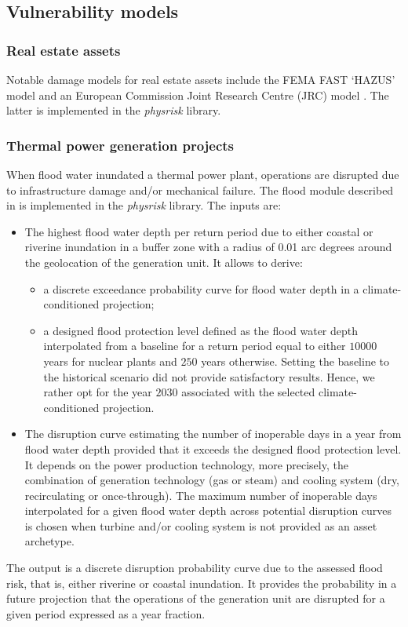 \documentclass[a4paper,11pt]{extarticle} %
\theoremstyle{definition}
\begin{document}
\subsection{Vulnerability models}

\subsubsection{Real estate assets}
Notable damage models for real estate assets include the FEMA FAST `HAZUS' model \cite{ScawthornEtAl:2006} and an European Commission Joint Research Centre (JRC) model \cite{HuizingaEtAl:2017}. The latter is implemented in the \emph{physrisk} library.

\subsubsection{Thermal power generation projects}
When flood water inundated a thermal power plant, operations are disrupted due to infrastructure damage and/or mechanical failure. The flood module described in \cite{LuoEtAl:2021,LuoEtAl:2023} is implemented in the \emph{physrisk} library. The inputs are:
\begin{itemize}
\item The highest flood water depth per return period due to either coastal or riverine inundation in a buffer zone with a radius of 0.01 arc degrees around the geolocation of the generation unit. It allows to derive:
\begin{itemize}
\item a discrete exceedance probability curve for flood water depth in a climate-conditioned projection;
\item a designed flood protection level defined as the flood water depth interpolated from a baseline for a return period equal to either $10000$ years for nuclear plants and $250$ years otherwise. Setting the baseline to the historical scenario did not provide satisfactory results. Hence, we rather opt for the year $2030$ associated with the selected climate-conditioned projection.
\end{itemize}
\item The disruption curve estimating the number of inoperable days in a year from flood water depth provided that it exceeds the designed flood protection level. It depends on the power production technology, more precisely, the combination of generation technology (gas or steam) and cooling system (dry, recirculating or once-through). The maximum number of inoperable days interpolated for a given flood water depth across potential disruption curves is chosen when turbine and/or cooling system is not provided as an asset archetype.
\end{itemize}
The output is a discrete disruption probability curve due to the assessed flood risk, that is, either riverine or coastal inundation. It provides the probability in a future projection that the operations of the generation unit are disrupted for a given period expressed as a year fraction.
\end{document}
